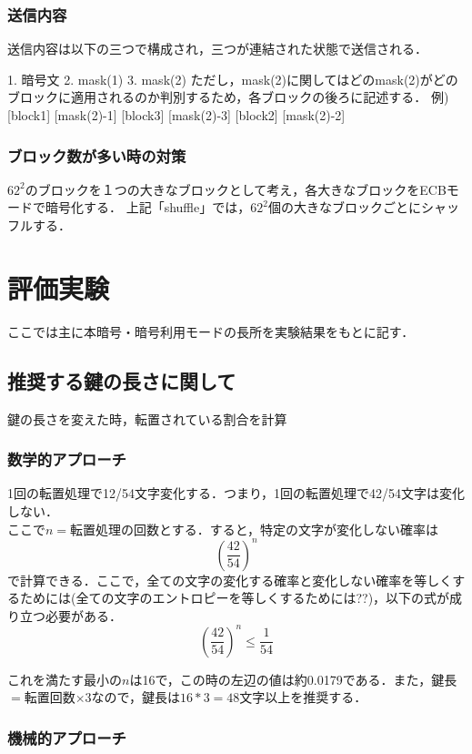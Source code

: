 \documentclass{jsarticle}
\begin{document}
\subsubsection{送信内容}
送信内容は以下の三つで構成され，三つが連結された状態で送信される．

1. 暗号文
2. mask(1)
3. mask(2)
ただし，mask(2)に関してはどのmask(2)がどのブロックに適用されるのか判別するため，各ブロックの後ろに記述する．
例) [block1] [mask(2)-1] [block3] [mask(2)-3] [block2] [mask(2)-2]

\subsubsection{ブロック数が多い時の対策}
\(62^2\)のブロックを１つの大きなブロックとして考え，各大きなブロックをECBモードで暗号化する．
上記「shuffle」では，\(62^2\)個の大きなブロックごとにシャッフルする．

\section{評価実験}
ここでは主に本暗号・暗号利用モードの長所を実験結果をもとに記す．
\subsection{推奨する鍵の長さに関して}
鍵の長さを変えた時，転置されている割合を計算\\
\subsubsection{数学的アプローチ}
1回の転置処理で12/54文字変化する．つまり，1回の転置処理で42/54文字は変化しない．\\
ここで$n=$転置処理の回数とする．すると，特定の文字が変化しない確率は
\[\left(\frac{42}{54}\right)^n\]
で計算できる．ここで，全ての文字の変化する確率と変化しない確率を等しくするためには(全ての文字のエントロピーを等しくするためには??)，以下の式が成り立つ必要がある．
\[\left(\frac{42}{54}\right)^n \leq \frac{1}{54}\]

これを満たす最小の$n$は16で，この時の左辺の値は約0.0179である．また，鍵長$=$転置回数$\times 3$なので，鍵長は$16*3=48$文字以上を推奨する．

\subsubsection{機械的アプローチ}
\end{document}
